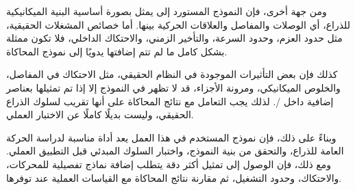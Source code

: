 ومن جهة أخرى، فإن النموذج المستورد إلى  يمثل بصورة أساسية البنية الميكانيكية للذراع، أي الوصلات والمفاصل والعلاقات الحركية بينها. أما خصائص المشغلات الحقيقية، مثل حدود العزم، وحدود السرعة، والتأخير الزمني، والاحتكاك الداخلي، فلا تكون ممثلة بشكل كامل ما لم تتم إضافتها يدويًا إلى نموذج المحاكاة.

كذلك فإن بعض التأثيرات الموجودة في النظام الحقيقي، مثل الاحتكاك في المفاصل، والخلوص الميكانيكي، ومرونة الأجزاء، قد لا تظهر في النموذج إلا إذا تم تمثيلها بعناصر إضافية داخل /. لذلك يجب التعامل مع نتائج المحاكاة على أنها تقريب لسلوك الذراع الحقيقي، وليست بديلًا كاملًا عن الاختبار العملي.

وبناءً على ذلك، فإن نموذج  المستخدم في هذا العمل يعد أداة مناسبة لدراسة الحركة العامة للذراع، والتحقق من بنية النموذج، واختبار السلوك المبدئي قبل التطبيق العملي. ومع ذلك، فإن الوصول إلى تمثيل أكثر دقة يتطلب إضافة نماذج تفصيلية للمحركات، والاحتكاك، وحدود التشغيل، ثم مقارنة نتائج المحاكاة مع القياسات العملية عند توفرها.